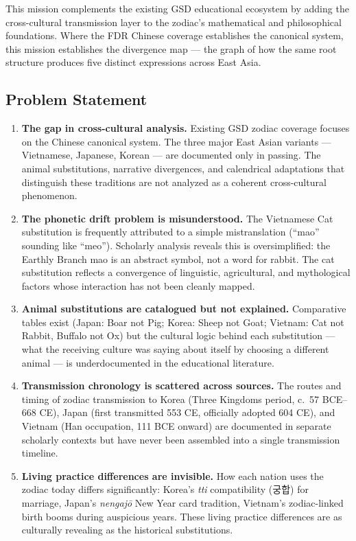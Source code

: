 \documentclass[11pt,letterpaper]{article}
\begin{document}
This mission complements the existing GSD educational ecosystem by adding the cross-cultural transmission layer to the zodiac's mathematical and philosophical foundations. Where the FDR Chinese coverage establishes the canonical system, this mission establishes the divergence map --- the graph of how the same root structure produces five distinct expressions across East Asia.

\subsection{Problem Statement}

\begin{enumerate}[leftmargin=2em]
  \item \textbf{The gap in cross-cultural analysis.} Existing GSD zodiac coverage focuses on the Chinese canonical system. The three major East Asian variants --- Vietnamese, Japanese, Korean --- are documented only in passing. The animal substitutions, narrative divergences, and calendrical adaptations that distinguish these traditions are not analyzed as a coherent cross-cultural phenomenon.

  \item \textbf{The phonetic drift problem is misunderstood.} The Vietnamese Cat substitution is frequently attributed to a simple mistranslation (``mao'' sounding like ``meo''). Scholarly analysis reveals this is oversimplified: the Earthly Branch mao is an abstract symbol, not a word for rabbit. The cat substitution reflects a convergence of linguistic, agricultural, and mythological factors whose interaction has not been cleanly mapped.

  \item \textbf{Animal substitutions are catalogued but not explained.} Comparative tables exist (Japan: Boar not Pig; Korea: Sheep not Goat; Vietnam: Cat not Rabbit, Buffalo not Ox) but the cultural logic behind each substitution --- what the receiving culture was saying about itself by choosing a different animal --- is underdocumented in the educational literature.

  \item \textbf{Transmission chronology is scattered across sources.} The routes and timing of zodiac transmission to Korea (Three Kingdoms period, c.\ 57 BCE--668 CE), Japan (first transmitted 553 CE, officially adopted 604 CE), and Vietnam (Han occupation, 111 BCE onward) are documented in separate scholarly contexts but have never been assembled into a single transmission timeline.

  \item \textbf{Living practice differences are invisible.} How each nation uses the zodiac today differs significantly: Korea's \textit{tti} compatibility (궁합) for marriage, Japan's \textit{nengaj\={o}} New Year card tradition, Vietnam's zodiac-linked birth booms during auspicious years. These living practice differences are as culturally revealing as the historical substitutions.
\end{enumerate}
\end{document}
